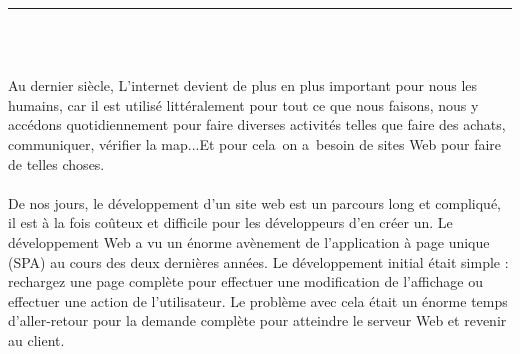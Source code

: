 \documentclass[12pt]{report}
\begin{document}
\listoftables



\newpage

\pagestyle{myfancy}

\vspace*{-0.2in}

\setcounter{page}{1}

\begin{center}
    {\color{Black} \rule{6.2in}{1.4mm} }\\
    \vspace{0.1in}
    \scshape{\fontsize{34}{46}{\bfseries{\color{Black}{Introduction générale}}}}
    \\
    \vspace{0.5in}
\end{center}
\hspace*{0.16in}
Au dernier siècle, L'internet devient de plus en plus important pour nous les humains, car il est utilisé littéralement pour tout ce que nous faisons, nous y accédons quotidiennement pour faire diverses activités telles que faire des achats, communiquer, vérifier la map...Et pour cela on a besoin de sites Web pour faire de telles choses.
\\\\
\hspace*{0.16in}
De nos jours, le développement d'un site web est un parcours long et compliqué, il est à la fois coûteux et difficile pour les développeurs d'en créer un. Le développement Web a vu un énorme avènement de l’application à page unique (SPA) au cours des deux dernières années. Le développement initial était simple : rechargez une page complète pour effectuer une modification de l’affichage ou effectuer une action de l’utilisateur. Le problème avec cela était un énorme temps d’aller-retour pour la demande complète pour atteindre le serveur Web et revenir au client.
\\\\
\hspace*{0.16in}
\end{document}
